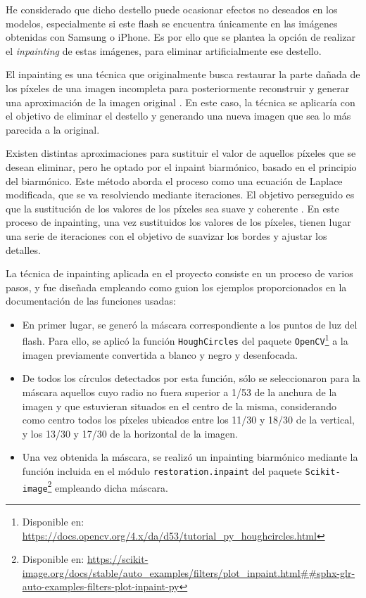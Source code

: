 He considerado que dicho destello puede ocasionar efectos no deseados en los modelos, especialmente si este flash se encuentra únicamente en las imágenes obtenidas con Samsung o iPhone. Es por ello que se plantea la opción de realizar el \textit{inpainting} de estas imágenes, para eliminar artificialmente ese destello.

El inpainting es una técnica que originalmente busca restaurar la parte dañada de los píxeles de una imagen incompleta para posteriormente reconstruir y generar una aproximación de la imagen original \cite{inp:review}. En este caso, la técnica se aplicaría con el objetivo de eliminar el destello y generando una nueva imagen que sea lo más parecida a la original.

Existen distintas aproximaciones para sustituir el valor de aquellos píxeles que se desean eliminar, pero he optado por el inpaint biarmónico, basado en el principio del biarmónico. Este método aborda el proceso como una ecuación de Laplace modificada, que se va resolviendo mediante iteraciones. El objetivo perseguido es que la sustitución de los valores de los píxeles sea suave y coherente \cite{inp:biharmo}. En este proceso de inpainting, una vez sustituidos los valores de los píxeles, tienen lugar una serie de iteraciones con el objetivo de suavizar los bordes y ajustar los detalles.

La técnica de inpainting aplicada en el proyecto consiste en un proceso de varios pasos, y fue diseñada empleando como guion los ejemplos proporcionados en la documentación de las funciones usadas:

\begin{itemize}
    \item En primer lugar, se generó la máscara correspondiente a los puntos de luz del flash. Para ello, se aplicó la función \texttt{HoughCircles} del paquete \texttt{OpenCV}\footnote{Disponible en: \url{https://docs.opencv.org/4.x/da/d53/tutorial_py_houghcircles.html}} a la imagen previamente convertida a blanco y negro y desenfocada.
    
    \item De todos los círculos detectados por esta función, sólo se seleccionaron para la máscara aquellos cuyo radio no fuera superior a 1/53 de la anchura de la imagen y que estuvieran situados en el centro de la misma, considerando como centro todos los píxeles ubicados entre los 11/30 y 18/30 de la vertical, y los 13/30 y 17/30 de la horizontal de la imagen.

    \item Una vez obtenida la máscara, se realizó un inpainting biarmónico mediante la función incluida en el módulo \texttt{restoration.inpaint} del paquete \texttt{Scikit-image}\footnote{Disponible en: \url{https://scikit-image.org/docs/stable/auto_examples/filters/plot_inpaint.html##sphx-glr-auto-examples-filters-plot-inpaint-py}} empleando dicha máscara.
\end{itemize}

